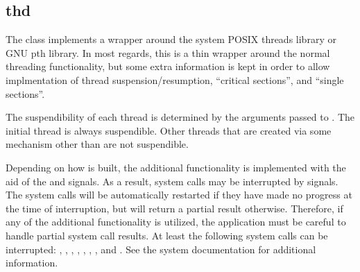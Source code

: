 %
%
%
%
%              

\subsection{thd}
\label{thd}

The  class implements a wrapper around the system POSIX threads
library or GNU pth library.  In most regards, this is a thin wrapper around the
normal threading functionality, but some extra information is kept in order to
allow implmentation of thread suspension/resumption, ``critical sections'', and
``single sections''.

The suspendibility of each thread is determined by the arguments passed to
.  The initial thread is always suspendible.  Other threads
that are created via some mechanism other than  are not
suspendible.

Depending on how  is built, the additional functionality is
implemented with the aid of the  and  signals.  As a
result, system calls may be interrupted by signals.  The system calls will be
automatically restarted if they have made no progress at the time of
interruption, but will return a partial result otherwise.  Therefore, if any of
the additional functionality is utilized, the application must be careful to
handle partial system call results.  At least the following system calls can be
interrupted: , , ,
, , , , and
.  See the system documentation for additional information.

